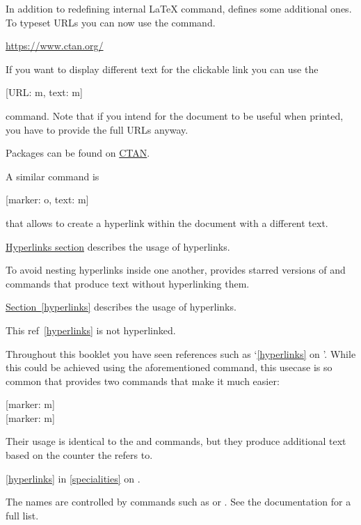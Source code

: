 In addition to redefining internal \LaTeX{} command,  defines
some additional ones. To typeset URLs you can now use the  command.
\begin{example}
\url{https://www.ctan.org/}
\end{example}
If you want to display different text for the clickable link you can use the
\begin{lscommand}
  [URL: m, text: m]
\end{lscommand}
command. Note that if you intend for the document to be useful when printed,
you have to provide the full URLs anyway.
\begin{example}
Packages can be found on
\href{https://www.ctan.org/}{
  CTAN}.
\end{example}

A similar command is
\begin{lscommand}
  [marker: o, text: m]
\end{lscommand}
that allows to create a hyperlink within the document with a different text.
\begin{example}
\hyperref[hyperlinks]{
  Hyperlinks section}
describes the usage of
hyperlinks.
\end{example}
To avoid nesting hyperlinks inside one another,  provides starred
versions of  and  commands that produce text without
hyperlinking them.
\begin{example}
\hyperref[hyperlinks]{
  Section~\ref*{hyperlinks}}
describes the usage of
hyperlinks.

This ref~\ref*{hyperlinks}
is not hyperlinked.
\end{example}

Throughout this booklet you have seen references such as
\enquote*{\autoref{hyperlinks} on }. While this could
be achieved using the aforementioned  command, this usecase is so
common that  provides two commands that make it much easier:
\begin{lscommand}
  [marker: m] \\
  [marker: m]
\end{lscommand}
Their usage is identical to the  and  commands, but they
produce additional text based on the counter the  refers to.
\begin{example}
\autoref{hyperlinks} in
\autoref{specialities} on
.
\end{example}
The names are controlled by commands such as  or
. See the  documentation for a full list.

